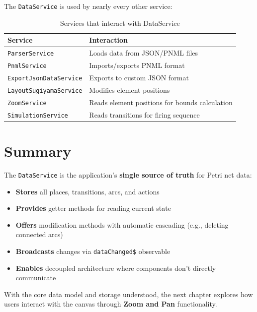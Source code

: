 The \texttt{DataService} is used by nearly every other service:

\begin{table}[htb]
    \centering
    \begin{tabular}{ll}
        \toprule
        \textbf{Service} & \textbf{Interaction} \\
        \midrule
        \texttt{ParserService} & Loads data from JSON/PNML files \\
        \texttt{PnmlService} & Imports/exports PNML format \\
        \texttt{ExportJsonDataService} & Exports to custom JSON format \\
        \texttt{LayoutSugiyamaService} & Modifies element positions \\
        \texttt{ZoomService} & Reads element positions for bounds calculation \\
        \texttt{SimulationService} & Reads transitions for firing sequence \\
        \bottomrule
    \end{tabular}
    \caption{Services that interact with DataService}
    \label{tab:data-service-interactions}
\end{table}

\section{Summary}
\label{sec:data-summary}

The \texttt{DataService} is the application's \textbf{single source of truth} for Petri net data:

\begin{itemize}
    \item \textbf{Stores} all places, transitions, arcs, and actions
    \item \textbf{Provides} getter methods for reading current state
    \item \textbf{Offers} modification methods with automatic cascading (e.g., deleting connected arcs)
    \item \textbf{Broadcasts} changes via \texttt{dataChanged\$} observable
    \item \textbf{Enables} decoupled architecture where components don't directly communicate
\end{itemize}

With the core data model and storage understood, the next chapter explores how users interact with the canvas through \textbf{Zoom and Pan} functionality.
